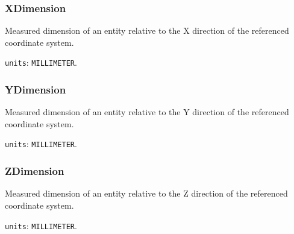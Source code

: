 \subsubsection{XDimension}
\label{sec:XDimension}



Measured dimension of an entity relative to the X direction of the referenced coordinate system.


\texttt{units}: \texttt{MILLIMETER}.


\subsubsection{YDimension}
\label{sec:YDimension}



Measured dimension of an entity relative to the Y direction of the referenced coordinate system.


\texttt{units}: \texttt{MILLIMETER}.


\subsubsection{ZDimension}
\label{sec:ZDimension}



Measured dimension of an entity relative to the Z direction of the referenced coordinate system.


\texttt{units}: \texttt{MILLIMETER}.

